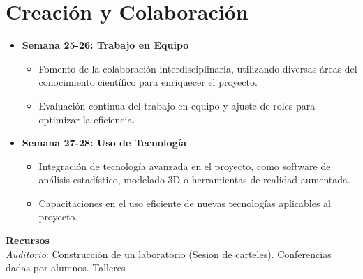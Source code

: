 \newpage
\section{Creación y Colaboración}
\begin{itemize}
  \item \textbf{Semana 25-26: Trabajo en Equipo}
  \begin{itemize}
    \item Fomento de la colaboración interdisciplinaria, utilizando diversas áreas del conocimiento científico para enriquecer el proyecto.
    \item Evaluación continua del trabajo en equipo y ajuste de roles para optimizar la eficiencia.
  \end{itemize}
  \item \textbf{Semana 27-28: Uso de Tecnología}
  \begin{itemize}
    \item Integración de tecnología avanzada en el proyecto, como software de análisis estadístico, modelado 3D o herramientas de realidad aumentada.
    \item Capacitaciones en el uso eficiente de nuevas tecnologías aplicables al proyecto.
  \end{itemize}
\end{itemize}

{\large \textbf{Recursos}}\\
\textit{Auditorio}: Construcción de un laboratorio (Sesion de carteles). Conferencias dadas por alumnos. Talleres

